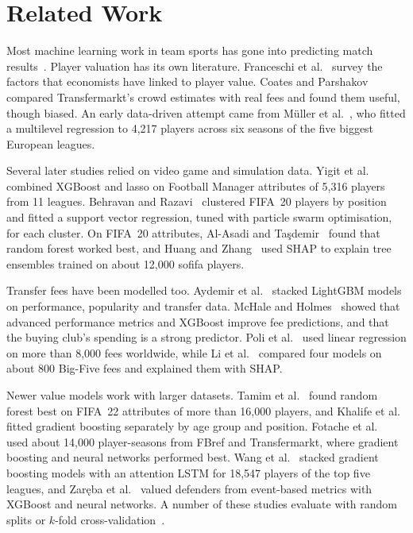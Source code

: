\documentclass[conference]{IEEEtran}
\begin{document}
\section{Related Work}

Most machine learning work in team sports has gone into predicting match results~\cite{bunker2022application}. Player valuation has its own literature. Franceschi et al.~\cite{franceschi2024determinants} survey the factors that economists have linked to player value. Coates and Parshakov~\cite{coates2022wisdom} compared Transfermarkt's crowd estimates with real fees and found them useful, though biased. An early data-driven attempt came from M\"uller et al.~\cite{mueller2017beyond}, who fitted a multilevel regression to 4,217 players across six seasons of the five biggest European leagues.

Several later studies relied on video game and simulation data. Yigit et al.~\cite{yigit2020xgboost} combined XGBoost and lasso on Football Manager attributes of 5,316 players from 11 leagues. Behravan and Razavi~\cite{behravan2021novel} clustered FIFA~20 players by position and fitted a support vector regression, tuned with particle swarm optimisation, for each cluster. On FIFA~20 attributes, Al-Asadi and Ta\c{s}demir~\cite{alasadi2022predict} found that random forest worked best, and Huang and Zhang~\cite{huang2023explainable} used SHAP to explain tree ensembles trained on about 12,000 sofifa players.

Transfer fees have been modelled too. Aydemir et al.~\cite{aydemir2022ensembling} stacked LightGBM models on performance, popularity and transfer data. McHale and Holmes~\cite{mchale2023estimating} showed that advanced performance metrics and XGBoost improve fee predictions, and that the buying club's spending is a strong predictor. Poli et al.~\cite{poli2024statistical} used linear regression on more than 8,000 fees worldwide, while Li et al.~\cite{li2026interpretable} compared four models on about 800 Big-Five fees and explained them with SHAP.

Newer value models work with larger datasets. Tamim et al.~\cite{tamim2025machine} found random forest best on FIFA~22 attributes of more than 16,000 players, and Khalife et al.~\cite{khalife2025dynamic} fitted gradient boosting separately by age group and position. Fotache et al.~\cite{fotache2026machine} used about 14,000 player-seasons from FBref and Transfermarkt, where gradient boosting and neural networks performed best. Wang et al.~\cite{wang2026predicting} stacked gradient boosting models with an attention LSTM for 18,547 players of the top five leagues, and Zar\k{e}ba et al.~\cite{zareba2025decoding} valued defenders from event-based metrics with XGBoost and neural networks. A number of these studies evaluate with random splits or $k$-fold cross-validation~\cite{tamim2025machine,khalife2025dynamic,wang2026predicting}.
\end{document}
